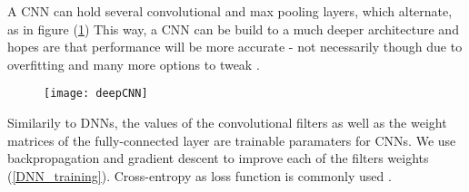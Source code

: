 \documentclass{article}
\begin{document}
A CNN can hold several convolutional and max pooling layers, which alternate, as in figure (\ref{chevalyre}) This way, a CNN can be build to a much deeper architecture and hopes are that performance will be more accurate - not necessarily though due to overfitting and many more options to tweak \citep{performance_tweaks}.

\begin{figure}[ht]
\vskip 0.2in
\begin{center}
\centerline{\texttt{[image: deepCNN]}}
\caption{\cite{chevalyre}\label{chevalyre}}
\end{center}
\vskip -0.2in
\end{figure}


Similarily to DNNs, the values of the convolutional filters as well as the weight matrices of the fully-connected layer are trainable paramaters for CNNs. We use backpropagation and gradient descent to improve each of the filters weights \citep{uniform_distribut} (\ref{DNN_training}). Cross-entropy as loss function is commonly used \cite{cs231:optimizers}.
\end{document}

